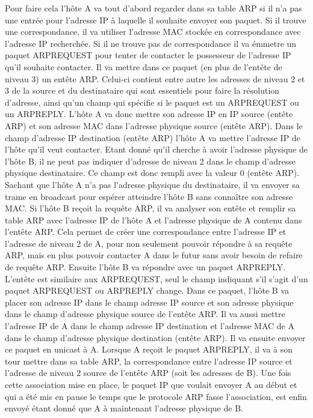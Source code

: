 Pour faire cela l'hôte A va tout d'abord regarder dans sa table ARP si il n'a
pas une entrée pour l'adresse IP à laquelle il souhaite envoyer son paquet. Si
il trouve une correspondance, il va utiliser l'adresse MAC stockée en
correspondance avec l'adresse IP recherchée.  Si il ne trouve pas de
correspondance il va émmetre un paquet ARPREQUEST pour tenter de contacter le
possesseur de l'adresse IP qu'il souhaite contacter. Il va mettre dans ce
paquet (en plus de l'entête de niveau 3) un entête ARP. Celui-ci contient entre
autre les adresses de niveau 2 et 3 de la source et du destinataire qui sont
essentiels pour faire la résolution d'adresse, ainsi qu'un champ qui spécifie
si le paquet est un ARPREQUEST ou un ARPREPLY.  L'hôte A va donc mettre son
adresse IP en IP source (entête ARP) et son adresse MAC dans l'adresse physique
source (entête ARP). Dans le champ d'adresse IP destination (entête ARP) l'hôte
A va mettre l'adresse IP de l'hôte qu'il veut contacter. Etant donné qu'il
cherche à avoir l'adresse physique de l'hôte B, il ne peut pas indiquer
d'adresse de niveau 2 dans le champ d'adresse physique destinataire. Ce champ
est donc rempli avec la valeur 0 (entête ARP).  Sachant que l'hôte A n'a pas
l'adresse physique du destinataire, il va envoyer sa trame en broadcast pour
espérer atteindre l'hôte B sans connaître son adresse MAC.  Si l'hôte B reçoit
la requête ARP, il va analyser son entête et remplir sa table ARP avec
l'adresse IP de l'hôte A et l'adresse physique de A contenu dans l'entête ARP.
Cela permet de créer une correspondance entre l'adresse IP et l'adresse de
niveau 2 de A, pour non seulement pouvoir répondre à sa requête ARP, mais en
plus pouvoir contacter A dans le futur sans avoir besoin de refaire de requête
ARP. Ensuite l'hôte B va répondre avec un paquet ARPREPLY. L'entête est
similaire aux ARPREQUEST, seul le champ indiquant s'il s'agit d'un paquet
ARPREQUEST ou ARPREPLY change. Dans ce paquet, l'hôte B va placer son adresse
IP dans le champ adresse IP source et son adresse physique dans le champ
d'adresse physique source de l'entête ARP. Il va aussi mettre l'adresse IP de A
dans le champ adresse IP destination et l'adresse MAC de A dans le champ
d'adresse physique destination (entête ARP).  Il va ensuite envoyer ce paquet
en unicast à A.  Lorsque A reçoit le paquet ARPREPLY, il va à son tour mettre
dans sa table ARP, la correspondance entre l'adresse IP source et l'adresse de
niveau 2 source de l'entête ARP (soit les adresses de B).  Une fois cette
association mise en place, le paquet IP que voulait envoyer A au début et qui a
été mis en pause le temps que le protocole ARP fasse l'association, est enfin
envoyé étant donné que A à maintenant l'adresse physique de B.


